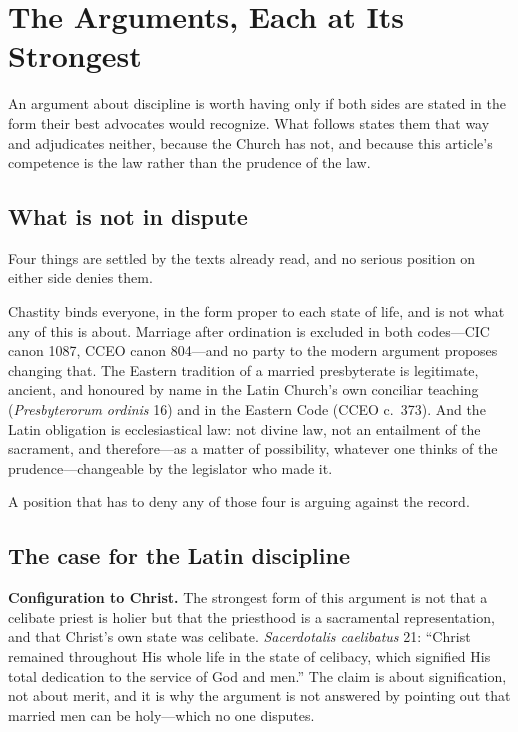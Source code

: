 \section{The Arguments, Each at Its Strongest}

An argument about discipline is worth having only if both sides are stated in the form their best advocates would recognize. What follows states them that way and adjudicates neither, because the Church has not, and because this article's competence is the law rather than the prudence of the law.

\subsection{What is not in dispute}

Four things are settled by the texts already read, and no serious position on either side denies them.

Chastity binds everyone, in the form proper to each state of life, and is not what any of this is about. Marriage after ordination is excluded in both codes---CIC canon 1087, CCEO canon 804---and no party to the modern argument proposes changing that. The Eastern tradition of a married presbyterate is legitimate, ancient, and honoured by name in the Latin Church's own conciliar teaching (\emph{Presbyterorum ordinis} 16) and in the Eastern Code (CCEO c.~373). And the Latin obligation is ecclesiastical law: not divine law, not an entailment of the sacrament, and therefore---as a matter of possibility, whatever one thinks of the prudence---changeable by the legislator who made it.

A position that has to deny any of those four is arguing against the record.

\subsection{The case for the Latin discipline}

\textbf{Configuration to Christ.} The strongest form of this argument is not that a celibate priest is holier but that the priesthood is a sacramental representation, and that Christ's own state was celibate. \emph{Sacerdotalis caelibatus} 21: ``Christ remained throughout His whole life in the state of celibacy, which signified His total dedication to the service of God and men.'' The claim is about signification, not about merit, and it is why the argument is not answered by pointing out that married men can be holy---which no one disputes.

